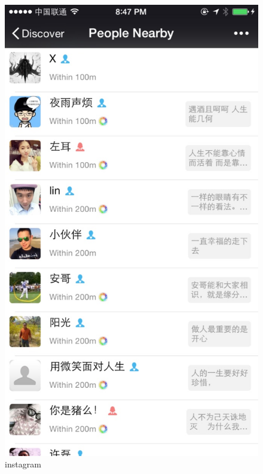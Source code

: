 \begin{figure}[h]
\begin{minipage}[t]{0.3\linewidth}
\includegraphics[width=\textwidth]{img/chap1/Nearby.jpg}
\caption{instagram\label{instagram}}
\end{minipage}
\begin{minipage}[t]{0.3\linewidth}
\centering

\end{minipage}
\end{figure}
